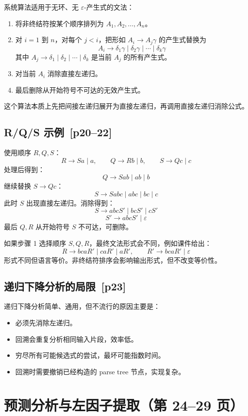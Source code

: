 \documentclass[UTF8,fontset=none,11pt]{ctexart}
\newcommand{\pg}[1]{\texorpdfstring{{\small\color{graytext}\,[p#1]}}{ [p#1]}}
\newcommand{\eps}{\varepsilon}
\begin{document}
系统算法适用于无环、无 \(\eps\)-产生式的文法：
\begin{enumerate}
  \item 将非终结符按某个顺序排列为 \(A_1,A_2,\ldots,A_n\)。
  \item 对 \(i=1\) 到 \(n\)，对每个 \(j<i\)，把形如 \(A_i\to A_j\gamma\) 的产生式替换为
  \[
  A_i\to \delta_1\gamma\mid\delta_2\gamma\mid\cdots\mid\delta_k\gamma
  \]
  其中 \(A_j\to\delta_1\mid\delta_2\mid\cdots\mid\delta_k\) 是当前 \(A_j\) 的所有产生式。
  \item 对当前 \(A_i\) 消除直接左递归。
  \item 最后删除从开始符号不可达的无效产生式。
\end{enumerate}

这个算法本质上先把间接左递归展开为直接左递归，再调用直接左递归消除公式。

\subsection{R/Q/S 示例 \pg{20--22}}
使用顺序 \(R,Q,S\)：
\[
R\to Sa\mid a,\qquad Q\to Rb\mid b,\qquad S\to Qc\mid c
\]
处理后得到：
\[
Q\to Sab\mid ab\mid b
\]
继续替换 \(S\to Qc\)：
\[
S\to Sabc\mid abc\mid bc\mid c
\]
此时 \(S\) 出现直接左递归。消除得到：
\[
S\to abcS'\mid bcS'\mid cS'
\]
\[
S'\to abcS'\mid\eps
\]
最后 \(Q,R\) 从开始符号 \(S\) 不可达，可删除。

如果步骤 1 选择顺序 \(S,Q,R\)，最终文法形式会不同，例如课件给出：
\[
R\to bcaR'\mid caR'\mid aR',\qquad R'\to bcaR'\mid\eps
\]
形式不同但语言等价。非终结符排序会影响输出形式，但不改变等价性。

\subsection{递归下降分析的局限 \pg{23}}
递归下降分析简单、通用，但不流行的原因主要是：
\begin{itemize}
  \item 必须先消除左递归。
  \item 回溯会重复分析相同输入片段，效率低。
  \item 穷尽所有可能候选式的尝试，最坏可能指数时间。
  \item 回溯时需要撤销已经构造的 parse tree 节点，实现复杂。
\end{itemize}

\section{预测分析与左因子提取（第 24--29 页）}
\end{document}
